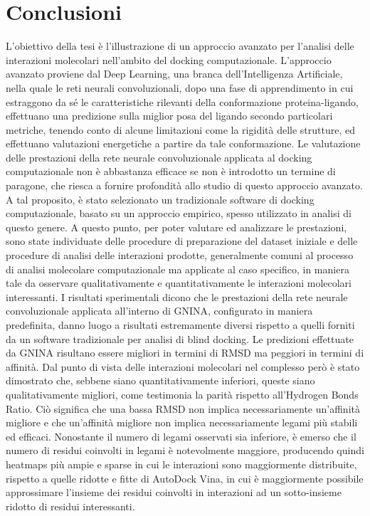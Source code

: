 \chapter*{Conclusioni}
\noindent L'obiettivo della tesi è l'illustrazione di un approccio avanzato per l'analisi delle interazioni molecolari nell'ambito del docking computazionale. L'approccio avanzato proviene dal Deep Learning, una branca dell'Intelligenza Artificiale, nella quale le reti neurali convoluzionali, dopo una fase di apprendimento in cui estraggono da sé le caratteristiche rilevanti della conformazione proteina-ligando, effettuano una predizione sulla miglior posa del ligando secondo particolari metriche, tenendo conto di alcune limitazioni come la rigidità delle strutture, ed effettuano valutazioni energetiche a partire da tale conformazione. 
Le valutazione delle prestazioni della rete neurale convoluzionale applicata al docking computazionale non è abbastanza efficace se non è introdotto un termine di paragone, che riesca a fornire profondità allo studio di questo approccio avanzato. A tal proposito, è stato selezionato un tradizionale software di docking computazionale, basato su un approccio empirico, spesso utilizzato in analisi di questo genere.
A questo punto, per poter valutare ed analizzare le prestazioni, sono state individuate delle procedure di preparazione del dataset iniziale e delle procedure di analisi delle interazioni prodotte, generalmente comuni al processo di analisi molecolare computazionale ma applicate al caso specifico, in maniera tale da osservare qualitativamente e quantitativamente le interazioni molecolari interessanti. 
I risultati sperimentali dicono che le prestazioni della rete neurale convoluzionale applicata all'interno di GNINA, configurato in maniera predefinita, danno luogo a risultati estremamente diversi rispetto a quelli forniti da un software tradizionale per analisi di blind docking. 
Le predizioni effettuate da GNINA risultano essere migliori in termini di RMSD ma peggiori in termini di affinità. Dal punto di vista delle interazioni molecolari nel complesso però è stato dimostrato che, sebbene siano quantitativamente inferiori, queste siano qualitativamente migliori, come testimonia la parità rispetto all'Hydrogen Bonds Ratio.
Ciò significa che una bassa RMSD non implica necessariamente un'affinità migliore e che un'affinità migliore non implica necessariamente legami più stabili ed efficaci. 
Nonostante il numero di legami osservati sia inferiore, è emerso che il numero di residui coinvolti in legami è notevolmente maggiore, producendo quindi heatmaps più ampie e sparse in cui le interazioni sono maggiormente distribuite, rispetto a quelle ridotte e fitte di AutoDock Vina, in cui è maggiormente possibile approssimare l'insieme dei residui coinvolti in interazioni ad un sotto-insieme ridotto di residui interessanti. 
